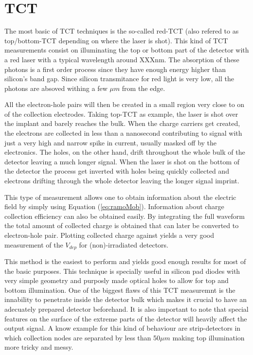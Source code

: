 \section{TCT} %
\label{sec:experimental_method}

The most basic of TCT techniques is the so-called red-TCT (also refered to as top/bottom-TCT depending on where the laser is shot). This kind of TCT measurements consist on illuminating the top or bottom part of the detector with a red laser with a typical wavelength around XXXnm. The absorption of these photons is a first order process since they have enough energy higher than silicon's band gap. Since silicon transmitance for red light is very low, all the photons are absoved withing a few $\mu m$ from the edge. 

All the electron-hole pairs will then be created in a small region very close to on of the collection electrodes. Taking top-TCT as example, the laser is shot over the implant and barely reaches the bulk. When the charge carriers get created, the electrons are collected in less than a nanosecond contributing to signal with just a very high and narrow spike in current, usually masked off by the electronics. The holes, on the other hand, drift throughout the whole bulk of the detector leaving a much longer signal. When the laser is shot on the bottom of the detector the process get inverted with holes being quickly collected and electrons drifting through the whole detector leaving the longer signal imprint.

This type of measurement allows one to obtain information about the electric field by simply using Equation (\ref{eq:ramoMob}). Information about charge collection efficiency can also be obtained easily. By integrating the full waveform the total amount of collected charge is obtained that can later be converted to electron-hole pair. Plotting collected charge against \vias yields a very good measurement of the $V_{dep}$ for (non)-irradiated detectors. 

This method is the easiest to perform and yields good enough results for most of the basic purposes. This technique is specially useful in silicon pad diodes with very simple geometry and purposly made optical holes to allow for top and bottom illumination. One of the biggest flaws of this TCT measuremnt is the innability to penetrate inside the detector bulk which makes it crucial to have an adecuately prepared detector beforehand. It is also important to note that special features on the surface of the extreme parts of the detector will heavily affect the output signal. A know example for this kind of behaviour are strip-detectors in which collection nodes are separated by less than 50$\mu m$ making top illumination more tricky and messy.

